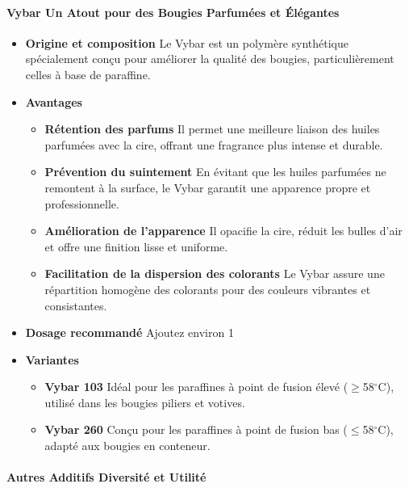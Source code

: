 \documentclass[11pt,fleqn,onecolumn,oneside]{book}
\begin{document}
\paragraph{Vybar Un Atout pour des Bougies Parfumées et Élégantes}

\begin{itemize}
    \item \textbf{Origine et composition} Le Vybar est un polymère synthétique spécialement conçu pour améliorer la qualité des bougies, particulièrement celles à base de paraffine.
    \item \textbf{Avantages}
        \begin{itemize}
            \item \textbf{Rétention des parfums} Il permet une meilleure liaison des huiles parfumées avec la cire, offrant une fragrance plus intense et durable.
            \item \textbf{Prévention du suintement} En évitant que les huiles parfumées ne remontent à la surface, le Vybar garantit une apparence propre et professionnelle.
            \item \textbf{Amélioration de l’apparence} Il opacifie la cire, réduit les bulles d’air et offre une finition lisse et uniforme.
            \item \textbf{Facilitation de la dispersion des colorants} Le Vybar assure une répartition homogène des colorants pour des couleurs vibrantes et consistantes.
        \end{itemize}
    \item \textbf{Dosage recommandé} Ajoutez environ 1 %
    \item \textbf{Variantes}
\begin{itemize}
    \item \textbf{Vybar 103} Id\'eal pour les paraffines \`a point de fusion \'elev\'e ($\geq$58$^\circ$C), utilis\'e dans les bougies piliers et votives.
    \item \textbf{Vybar 260} Con\c{c}u pour les paraffines \`a point de fusion bas ($\leq$58$^\circ$C), adapt\'e aux bougies en conteneur.
\end{itemize}

\end{itemize}

\paragraph{Autres Additifs Diversité et Utilité}
\end{document}
